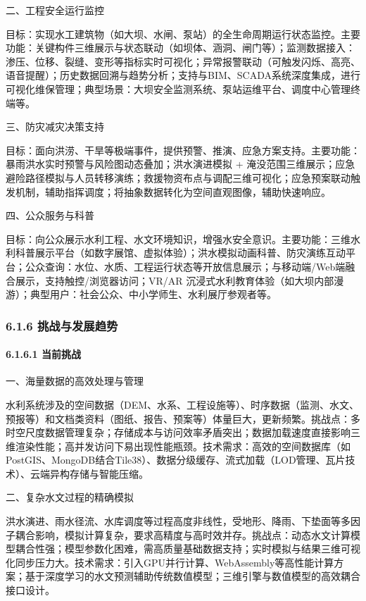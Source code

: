 二、工程安全运行监控

目标：实现水工建筑物（如大坝、水闸、泵站）的全生命周期运行状态监控。主要功能：关键构件三维展示与状态联动（如坝体、涵洞、闸门等）；监测数据接入：渗压、位移、裂缝、变形等指标实时可视化；异常报警联动（可触发闪烁、高亮、语音提醒）；历史数据回溯与趋势分析；支持与BIM、SCADA系统深度集成，进行可视化维保管理；典型场景：大坝安全监测系统、泵站运维平台、调度中心管理终端等。

三、防灾减灾决策支持

目标：面向洪涝、干旱等极端事件，提供预警、推演、应急方案支持。主要功能：暴雨洪水实时预警与风险图动态叠加；洪水演进模拟 + 淹没范围三维展示；应急避险路径模拟与人员转移演练；救援物资布点与调配三维可视化；应急预案联动触发机制，辅助指挥调度；将抽象数据转化为空间直观图像，辅助快速响应。

四、公众服务与科普

目标：向公众展示水利工程、水文环境知识，增强水安全意识。主要功能：三维水利科普展示平台（如数字展馆、虚拟体验）；洪水模拟动画科普、防灾演练互动平台；公众查询：水位、水质、工程运行状态等开放信息展示；与移动端/Web端融合展示，支持触控/浏览器访问；VR/AR 沉浸式水利教育体验（如大坝内部漫游）；典型用户：社会公众、中小学师生、水利展厅参观者等。

\hypertarget{ux6311ux6218ux4e0eux53d1ux5c55ux8d8bux52bf}{%
\subsubsection{6.1.6 挑战与发展趋势}\label{ux6311ux6218ux4e0eux53d1ux5c55ux8d8bux52bf}}

\hypertarget{ux5f53ux524dux6311ux6218}{%
\paragraph{6.1.6.1 当前挑战}\label{ux5f53ux524dux6311ux6218}}

一、海量数据的高效处理与管理

水利系统涉及的空间数据（DEM、水系、工程设施等）、时序数据（监测、水文、预报等）和文档类资料（图纸、报告、预案等）体量巨大，更新频繁。挑战点：多时空尺度数据管理复杂；存储成本与访问效率矛盾突出；数据加载速度直接影响三维渲染性能；高并发访问下易出现性能瓶颈。技术需求：高效的空间数据库（如PostGIS、MongoDB结合Tile38）、数据分级缓存、流式加载（LOD管理、瓦片技术）、云端异构存储与智能压缩。

二、复杂水文过程的精确模拟

洪水演进、雨水径流、水库调度等过程高度非线性，受地形、降雨、下垫面等多因子耦合影响，模拟计算复杂，要求高精度与高时效并存。挑战点：动态水文计算模型耦合性强；模型参数化困难，需高质量基础数据支持；实时模拟与结果三维可视化同步压力大。技术需求：引入GPU并行计算、WebAssembly等高性能计算方案；基于深度学习的水文预测辅助传统数值模型；三维引擎与数值模型的高效耦合接口设计。

